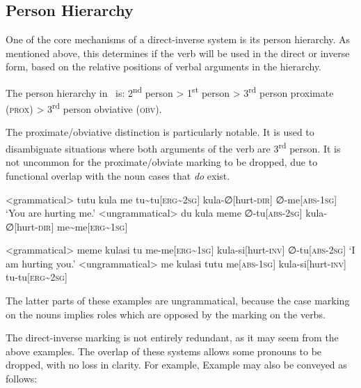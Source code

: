 \subsection{Person Hierarchy}\label{sec:person_hierarchy}
One of the core mechanisms of a direct-inverse system is its person hierarchy. As mentioned above, this determines if the verb will be used in the direct or inverse form, based on the relative positions of verbal arguments in the hierarchy.

The person hierarchy in \langname\ is: 2\textsuperscript{nd} person > 1\textsuperscript{st} person > 3\textsuperscript{rd} person proximate (\textsc{prox}) > 3\textsuperscript{rd} person obviative (\textsc{obv}).

The proximate/obviative distinction is particularly notable. It is used to disambiguate situations where both arguments of the verb are 3\textsuperscript{rd} person. It is not uncommon for the proximate/obviate marking to be dropped, due to functional overlap with the noun cases that \textit{do} exist.

\begin{paracol}{2}
\a<grammatical>
\begingl
\glpreamble tutu kula me
\endpreamble
tu\textasciitilde tu[\textsc{erg\textasciitilde 2sg}]
kula-∅[hurt-\textsc{dir}]
∅-me[\textsc{abs-1sg}]
\glft `You are hurting me.'
\endgl
\switchcolumn
\a<ungrammatical>
\begingl
\glpreamble \ljudge{*} du kula meme
\endpreamble
∅-tu[\textsc{abs-2sg}]
kula-∅[hurt-\textsc{dir}]
me\textasciitilde me[\textsc{erg\textasciitilde 1sg}]
\endgl
\end{paracol}
\xe


\begin{paracol}{2}
\a<grammatical>
\begingl
\glpreamble meme kulasi tu
\endpreamble
me-me[\textsc{erg\textasciitilde 1sg}]
kula-si[hurt-\textsc{inv}]
∅-tu[\textsc{abs-2sg}]
\glft `I am hurting you.'
\endgl
\switchcolumn
\a<ungrammatical>
\begingl
\glpreamble \ljudge{*} me kulasi tutu
\endpreamble
me[\textsc{abs-1sg}]
kula-si[hurt-\textsc{inv}]
tu-tu[\textsc{erg\textasciitilde 2sg}]
\endgl
\end{paracol}
\xe

The latter parts of these examples are ungrammatical, because the case marking on the nouns implies roles which are opposed by the marking on the verbs.

The direct-inverse marking is not entirely redundant, as it may seem from the above examples. The overlap of these systems allows some pronouns to be dropped, with no loss in clarity. For example, Example  may also be conveyed as follows:


